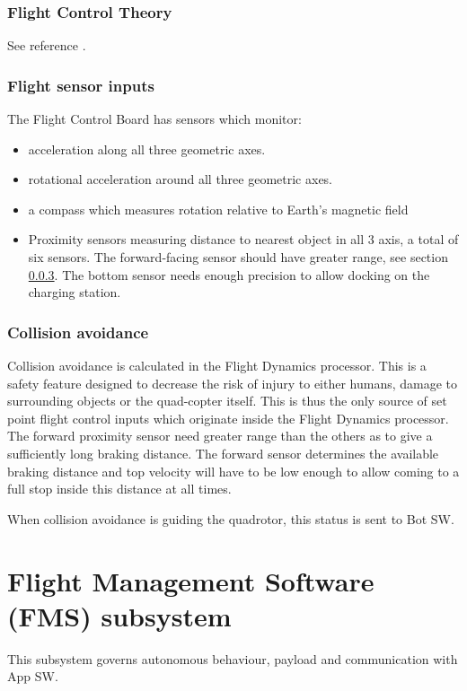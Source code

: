 \documentclass[a4paper]{article}
\begin{document}
  \subsubsection{Flight Control Theory}
  See reference \cite{fcb}.

  \subsubsection{Flight sensor inputs}
  \label{sec:flight-sensor-inputs}
  The Flight Control Board has sensors which monitor:
  \begin{itemize}
    \item acceleration along all three geometric axes.
    \item rotational acceleration around all three geometric axes.
    \item a compass which measures rotation relative to Earth's magnetic field
    \item Proximity sensors measuring distance to nearest object in all 3 axis, a total of six sensors. The forward-facing sensor should have greater range, see section \ref{sec:collision-avoidance}. The bottom sensor needs enough precision to allow docking on the charging station.
  \end{itemize}
  \subsubsection{Collision avoidance}
  \label{sec:collision-avoidance}
  Collision avoidance is calculated in the Flight Dynamics processor. This is a safety feature designed to decrease the risk of injury to either humans, damage to surrounding objects or the quad-copter itself. This is thus the only source of set point flight control inputs which originate inside the Flight Dynamics processor. The forward proximity sensor need greater range than the others as to give a sufficiently long braking distance. The forward sensor determines the available braking distance and top velocity will have to be low enough to allow coming to a full stop inside this distance at all times.

  When collision avoidance is guiding the quadrotor, this status is sent to Bot SW.

\section{Flight Management Software (FMS) subsystem}
This subsystem governs autonomous behaviour, payload and communication with App SW.
\end{document}
